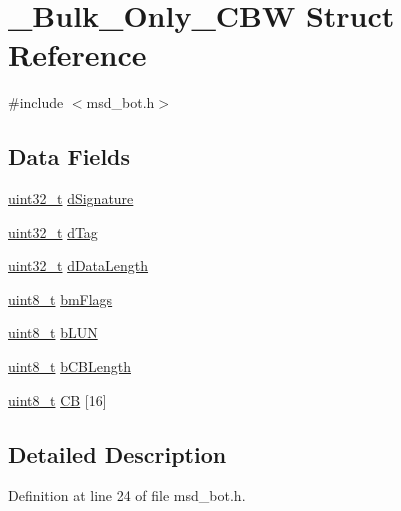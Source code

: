 \hypertarget{struct___bulk___only___c_b_w}{\section{\-\_\-\-Bulk\-\_\-\-Only\-\_\-\-C\-B\-W Struct Reference}
\label{struct___bulk___only___c_b_w}
}


{\ttfamily \#include $<$msd\-\_\-bot.\-h$>$}

\subsection*{Data Fields}
\begin{DoxyCompactItemize}
\item 
\hyperlink{stdint_8h_a435d1572bf3f880d55459d9805097f62}{uint32\-\_\-t} \hyperlink{struct___bulk___only___c_b_w_a69fb4197101a0865762f6eeeabfd2fc3}{d\-Signature}
\item 
\hyperlink{stdint_8h_a435d1572bf3f880d55459d9805097f62}{uint32\-\_\-t} \hyperlink{struct___bulk___only___c_b_w_a88450e01788f43e810892de0d7a2f7af}{d\-Tag}
\item 
\hyperlink{stdint_8h_a435d1572bf3f880d55459d9805097f62}{uint32\-\_\-t} \hyperlink{struct___bulk___only___c_b_w_ab6680907edce866e54a493d374529d99}{d\-Data\-Length}
\item 
\hyperlink{stdint_8h_aba7bc1797add20fe3efdf37ced1182c5}{uint8\-\_\-t} \hyperlink{struct___bulk___only___c_b_w_a472a427a009a162ef0286baa121e8f3e}{bm\-Flags}
\item 
\hyperlink{stdint_8h_aba7bc1797add20fe3efdf37ced1182c5}{uint8\-\_\-t} \hyperlink{struct___bulk___only___c_b_w_a14bf2d100e3d44cc47e3adb4d6958a1e}{b\-L\-U\-N}
\item 
\hyperlink{stdint_8h_aba7bc1797add20fe3efdf37ced1182c5}{uint8\-\_\-t} \hyperlink{struct___bulk___only___c_b_w_adfdf47a10c74aba8a40ee3f1820386e3}{b\-C\-B\-Length}
\item 
\hyperlink{stdint_8h_aba7bc1797add20fe3efdf37ced1182c5}{uint8\-\_\-t} \hyperlink{struct___bulk___only___c_b_w_a3e245c88e939802dd28d3a5f3dfff8b3}{C\-B} \mbox{[}16\mbox{]}
\end{DoxyCompactItemize}


\subsection{Detailed Description}


Definition at line 24 of file msd\-\_\-bot.\-h.



